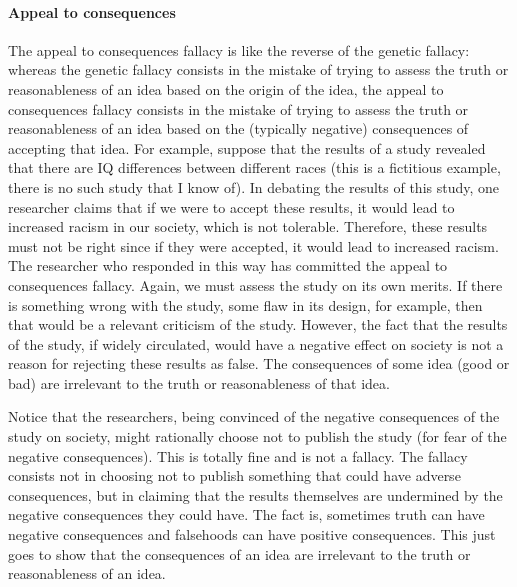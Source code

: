 \paragraph{Appeal to consequences}
The appeal to consequences fallacy is like the reverse of the genetic fallacy:
whereas the genetic fallacy consists in the mistake of trying to assess the truth or
reasonableness of an idea based on the origin of the idea, the appeal to
consequences fallacy consists in the mistake of trying to assess the truth or
reasonableness of an idea based on the (typically negative) consequences of
accepting that idea. For example, suppose that the results of a study revealed
that there are IQ differences between different races (this is a fictitious example,
there is no such study that I know of). In debating the results of this study, one
researcher claims that if we were to accept these results, it would lead to
increased racism in our society, which is not tolerable. Therefore, these results
must not be right since if they were accepted, it would lead to increased racism.
The researcher who responded in this way has committed the appeal to
consequences fallacy. Again, we must assess the study on its own merits. If
there is something wrong with the study, some flaw in its design, for example,
then that would be a relevant criticism of the study. However, the fact that the
results of the study, if widely circulated, would have a negative effect on society
is not a reason for rejecting these results as false. The consequences of some
idea (good or bad) are irrelevant to the truth or reasonableness of that idea.

Notice that the researchers, being convinced of the negative consequences of
the study on society, might rationally choose not to publish the study (for fear of
the negative consequences). This is totally fine and is not a fallacy. The fallacy
consists not in choosing not to publish something that could have adverse
consequences, but in claiming that the results themselves are undermined by
the negative consequences they could have. The fact is, sometimes truth can
have negative consequences and falsehoods can have positive consequences.
This just goes to show that the consequences of an idea are irrelevant to the
truth or reasonableness of an idea.
